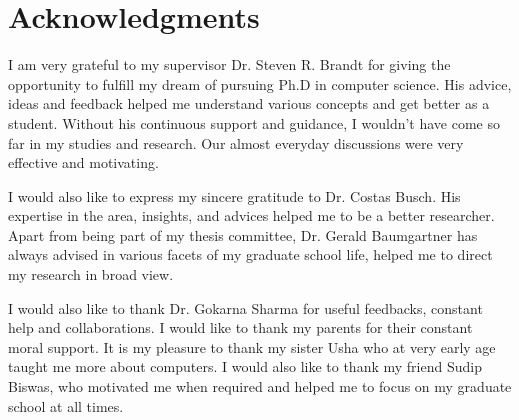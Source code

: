 \chapter*{Acknowledgments}
\label{ch:Acknowledgments}

I am very grateful to my supervisor Dr. Steven R. Brandt for giving the opportunity to fulfill my dream of pursuing Ph.D in computer science. His advice, ideas and feedback helped me understand various concepts and get better as a student. Without his continuous support and guidance, I wouldn't have come so far in my studies and research. Our almost everyday discussions were very effective and motivating.

I would also like to express my sincere gratitude to 
Dr. Costas Busch. His expertise in the area, insights,
and advices helped me to be a better researcher. Apart
from being part of my thesis committee, Dr. Gerald Baumgartner has always advised in various facets of
my graduate school life, helped me to direct my research
in broad view.

I would also like to thank Dr. Gokarna Sharma for useful feedbacks, constant help and collaborations. I would like to thank my parents for their constant moral support. It is  my pleasure to thank my sister Usha who at very early age taught me more about computers. I would also like to thank my friend Sudip Biswas, who motivated me when required and helped me to focus on my graduate school at all times.


